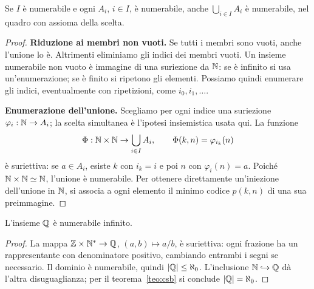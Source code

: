 \begin{schema}
\end{schema}

\begin{teorema}\label{teo:unione-numerabile}
Se $I$ è numerabile e ogni $A_i$, $i\in I$, è numerabile, anche $\bigcup_{i\in I}A_i$ è numerabile, nel quadro con assioma della scelta.
\end{teorema}
\begin{proof}
\textbf{Riduzione ai membri non vuoti.} Se tutti i membri sono vuoti, anche l'unione lo è. Altrimenti eliminiamo gli indici dei membri vuoti. Un insieme numerabile non vuoto è immagine di una suriezione da $\mathbb{N}$: se è infinito si usa un'enumerazione; se è finito si ripetono gli elementi. Possiamo quindi enumerare gli indici, eventualmente con ripetizioni, come $i_0,i_1,\ldots$.

\textbf{Enumerazione dell'unione.} Scegliamo per ogni indice una suriezione $\varphi_i:\mathbb{N}\to A_i$; la scelta simultanea è l'ipotesi insiemistica usata qui. La funzione
\[
\Phi:\mathbb{N}\times\mathbb{N}\to\bigcup_{i\in I}A_i,\qquad
\Phi(k,n)=\varphi_{i_k}(n)
\]
è suriettiva: se $a\in A_i$, esiste $k$ con $i_k=i$ e poi $n$ con $\varphi_i(n)=a$. Poiché $\mathbb{N}\times\mathbb{N}\simeq\mathbb{N}$, l'unione è numerabile. Per ottenere direttamente un'iniezione dell'unione in $\mathbb{N}$, si associa a ogni elemento il minimo codice $p(k,n)$ di una sua preimmagine.
\end{proof}

\begin{corollario}
L'insieme $\mathbb{Q}$ è numerabile infinito.
\end{corollario}
\begin{proof}
La mappa $\mathbb{Z}\times\mathbb{N}^*\to\mathbb{Q}$, $(a,b)\mapsto a/b$, è suriettiva: ogni frazione ha un rappresentante con denominatore positivo, cambiando entrambi i segni se necessario. Il dominio è numerabile, quindi $|\mathbb{Q}|\le\aleph_0$. L'inclusione $\mathbb{N}\hookrightarrow\mathbb{Q}$ dà l'altra disuguaglianza; per il teorema~\ref{teo:csb} si conclude $|\mathbb{Q}|=\aleph_0$.
\end{proof}

